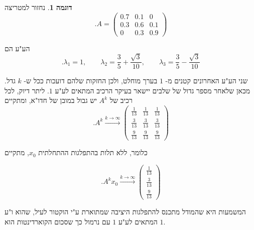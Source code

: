 \documentclass[12pt]{report}
\theoremstyle{plain}
\theoremstyle{definition}
\newtheorem{example}{דוגמה}[chapter]
\newcommand{\0}{\mathbf{0}}
\begin{document}
\begin{example}
נחזור למטריצה
$$
.A=
\begin{pmatrix}
0.7 & 0.1 & 0 \\
0.3 & 0.6 & 0.1 \\
0 & 0.3 & 0.9
\end{pmatrix}
$$

הע"ע הם
$$
.\lambda_1=1,\qquad
\lambda_2=\frac{3}{5}+\frac{\sqrt{3}}{10},
\qquad
\lambda_3=\frac{3}{5}-\frac{\sqrt{3}}{10}
$$

שני הע"ע האחרונים קטנים מ-
$1$
בערך מוחלט, ולכן החזקות שלהם דועכות ככל ש-
$k$
גדל.
מכאן שלאחר מספר גדול של שלבים יישאר בעיקר הרכיב המתאים לע"ע
$1$.
ליתר דיוק, לכל רכיב של
$A^k$
יש גבול במובן של חדו"א, ומתקיים
$$
.A^k
\xrightarrow{k \to \infty}
\begin{pmatrix}
\frac{1}{13} & \frac{1}{13} & \frac{1}{13}\\
\frac{3}{13} & \frac{3}{13} & \frac{3}{13}\\
\frac{9}{13} & \frac{9}{13} & \frac{9}{13}
\end{pmatrix}
$$

כלומר, ללא תלות בהתפלגות ההתחלתית 
$x_0$,
מתקיים

$$
.A^kx_0\xrightarrow{k \to \infty}
\begin{pmatrix}
\frac{1}{13}\\
\frac{3}{13}\\
\frac{9}{13}
\end{pmatrix}
$$

המשמעות היא שהמודל מתכנס להתפלגות היציבה שמתוארת ע"י הוקטור לעיל, שהוא ו"ע המתאים לע"ע 
$1$
עם נרמול כך שסכום הקוארדינטות הוא 
$1$.

\end{example}
\end{document}
